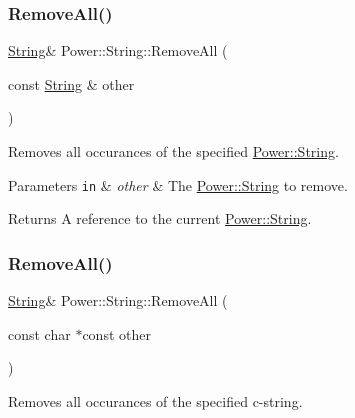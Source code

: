 \subsubsection{\texorpdfstring{Remove\+All()}{RemoveAll()}\hspace{0.1cm}{\footnotesize\ttfamily [1/4]}}
{\footnotesize\ttfamily \hyperlink{class_power_1_1_string}{String}\& Power\+::\+String\+::\+Remove\+All (\begin{DoxyParamCaption}\item[{const \hyperlink{class_power_1_1_string}{String} \&}]{other }\end{DoxyParamCaption})\hspace{0.3cm}{\ttfamily [inline]}}



Removes all occurances of the specified \hyperlink{class_power_1_1_string}{Power\+::\+String}. 


\begin{DoxyParams}[1]{Parameters}
\mbox{\tt in}  & {\em other} & The \hyperlink{class_power_1_1_string}{Power\+::\+String} to remove. \\
\hline
\end{DoxyParams}
\begin{DoxyReturn}{Returns}
A reference to the current \hyperlink{class_power_1_1_string}{Power\+::\+String}. 
\end{DoxyReturn}
\mbox{\label{class_power_1_1_string_add8a90782cd07cc66c639c364d828f1b}} 
\subsubsection{\texorpdfstring{Remove\+All()}{RemoveAll()}\hspace{0.1cm}{\footnotesize\ttfamily [2/4]}}
{\footnotesize\ttfamily \hyperlink{class_power_1_1_string}{String}\& Power\+::\+String\+::\+Remove\+All (\begin{DoxyParamCaption}\item[{const char $\ast$const}]{other }\end{DoxyParamCaption})\hspace{0.3cm}{\ttfamily [inline]}}



Removes all occurances of the specified c-\/string. 


